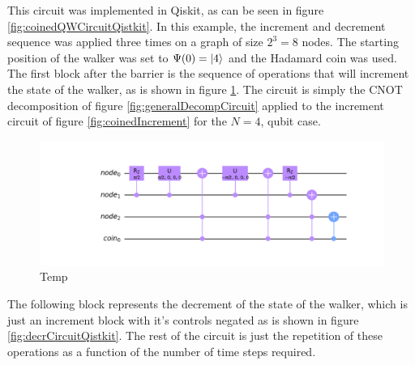 \documentclass[../../dissertation.tex]{subfiles}
\begin{document}
This circuit was implemented in Qiskit, as can be seen in figure \ref{fig:coinedQWCircuitQistkit}. In this example, the increment and decrement sequence was applied three times on a graph of size $2^3 =8$ nodes. The starting position of the walker was set to $\Psi(0) = \ket{4}$ and the Hadamard coin was used. The first block after the barrier is the sequence of operations that will increment the state of the walker, as is shown in figure \ref{fig:incrCircuitQistkit}. The circuit is simply the CNOT decomposition of figure \ref{fig:generalDecompCircuit} applied to the increment circuit of figure \ref{fig:coinedIncrement} for the $N=4$, qubit case.
\begin{figure}[!h]
	\centering
	\includegraphics[scale=0.35]{img/Qiskit/CoinedQuantumWalk/Circuits/circIncr_N3_S3.png}
	\caption{Temp} 
	\label{fig:incrCircuitQistkit}
\end{figure}
The following block represents the decrement of the state of the walker, which is just an increment block with it's controls negated as is shown in figure \ref{fig:decrCircuitQistkit}. The rest of the circuit is just the repetition of these operations as a function of the number of time steps required.
\end{document}
